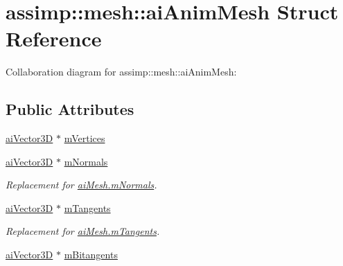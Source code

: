 \hypertarget{structassimp_1_1mesh_1_1ai_anim_mesh}{\section{assimp\+:\+:mesh\+:\+:ai\+Anim\+Mesh Struct Reference}
\label{structassimp_1_1mesh_1_1ai_anim_mesh}
}


Collaboration diagram for assimp\+:\+:mesh\+:\+:ai\+Anim\+Mesh\+:
\subsection*{Public Attributes}
\begin{DoxyCompactItemize}
\item 
\hyperlink{structai_vector3_d}{ai\+Vector3\+D} $\ast$ \hyperlink{structassimp_1_1mesh_1_1ai_anim_mesh_a3ba759b7b90d26017907f6c80557dcbf}{m\+Vertices}
\item 
\hypertarget{structassimp_1_1mesh_1_1ai_anim_mesh_a71dd0987890d3136b6b5b1c0a6711c3e}{\hyperlink{structai_vector3_d}{ai\+Vector3\+D} $\ast$ \hyperlink{structassimp_1_1mesh_1_1ai_anim_mesh_a71dd0987890d3136b6b5b1c0a6711c3e}{m\+Normals}}\label{structassimp_1_1mesh_1_1ai_anim_mesh_a71dd0987890d3136b6b5b1c0a6711c3e}

\begin{DoxyCompactList}\small\item\em Replacement for {\ttfamily \hyperlink{structassimp_1_1mesh_1_1ai_mesh_aee935013afc416792a945b36f7e99d5f}{ai\+Mesh.\+m\+Normals}}. \end{DoxyCompactList}\item 
\hypertarget{structassimp_1_1mesh_1_1ai_anim_mesh_a6535741c9f6eb62a0dfb666f0d8ea617}{\hyperlink{structai_vector3_d}{ai\+Vector3\+D} $\ast$ \hyperlink{structassimp_1_1mesh_1_1ai_anim_mesh_a6535741c9f6eb62a0dfb666f0d8ea617}{m\+Tangents}}\label{structassimp_1_1mesh_1_1ai_anim_mesh_a6535741c9f6eb62a0dfb666f0d8ea617}

\begin{DoxyCompactList}\small\item\em Replacement for {\ttfamily \hyperlink{structassimp_1_1mesh_1_1ai_mesh_abd53e75d34cbfc0e3e44768c664def15}{ai\+Mesh.\+m\+Tangents}}. \end{DoxyCompactList}\item 
\hypertarget{structassimp_1_1mesh_1_1ai_anim_mesh_a1a21e3a3e7abc17498c826d44eff7881}{\hyperlink{structai_vector3_d}{ai\+Vector3\+D} $\ast$ \hyperlink{structassimp_1_1mesh_1_1ai_anim_mesh_a1a21e3a3e7abc17498c826d44eff7881}{m\+Bitangents}}\label{structassimp_1_1mesh_1_1ai_anim_mesh_a1a21e3a3e7abc17498c826d44eff7881}


\end{DoxyCompactItemize}
